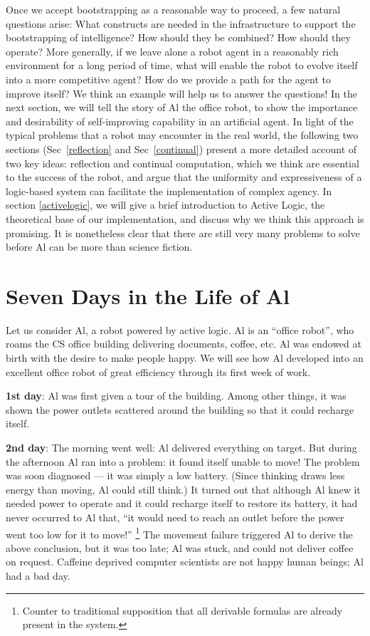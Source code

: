 \documentclass[]{llncs}
\begin{document}
Once we accept bootstrapping as a reasonable way to proceed, a few natural
questions arise: What constructs are needed in the infrastructure to
support the bootstrapping of intelligence?  How should they be combined?
How should they operate?  More generally, if we leave alone a robot agent
in a reasonably rich environment for a long period of time, what will
enable the robot to evolve itself into a more competitive agent?  How do we
provide a path for the agent to improve itself?  We think an example will
help us to answer the questions!  In the next section, we will tell the
story of Al the office robot, to show the importance and desirability of
self-improving capability in an artificial agent.  In light of the typical
problems that a robot may encounter in the real world, the following two
sections (Sec~\ref{reflection} and Sec~\ref{continual}) present a more
detailed account of two key ideas: reflection and continual computation,
which we think are essential to the success of the robot, and argue that
the uniformity and expressiveness of a logic-based system can facilitate
the implementation of complex agency.  In section \ref{activelogic}, we
will give a brief introduction to Active Logic, the theoretical base of our
implementation, and discuss why we think this approach is promising.  It is
nonetheless clear that there are still very many problems to solve before
Al can be more than science fiction.


\section{Seven Days in the Life of Al}

Let us consider Al, a robot powered by active logic.  Al is an {}``office
robot'', who roams the CS office building delivering documents, coffee,
etc.  Al was endowed at birth with the desire to make people happy.  We
will see how Al developed into an excellent office robot of great
efficiency through its first week of work.

\noindent \textbf{1st day}: Al was first given a tour of the building.
Among other things, it was shown the power outlets scattered around the
building so that it could recharge itself.

\noindent \textbf{2nd day}: The morning went well: Al delivered everything
on target.  But during the afternoon Al ran into a problem: it found itself
unable to move! The problem was soon diagnosed --- it was simply a low
battery.  (Since thinking draws less energy than moving, Al could still
think.) It turned out that although Al knew it needed power to operate and
it could recharge itself to restore its battery, it had never occurred to
Al that, {}``it would need to reach an outlet
before the power went too low for it to move!'' %
\footnote{Counter to traditional supposition that all derivable formulas
  are already present in the system.  } The movement failure triggered Al
to derive the above conclusion, but it was too late; Al was stuck, and
could not deliver coffee on request.  Caffeine deprived computer scientists
are not happy human beings; Al had a bad day.
\end{document}
